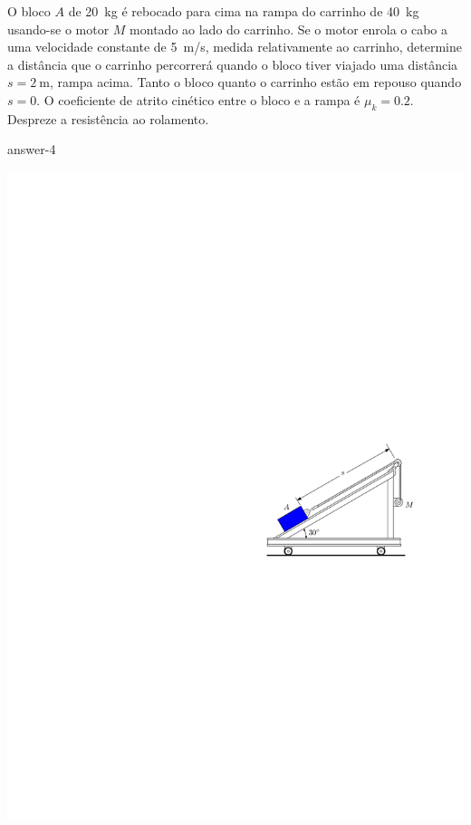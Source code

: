 \item O bloco $A$ de \SI{20}{\kilogram} é rebocado para cima na rampa do carrinho de \SI{40}{\kilogram} usando-se o motor $M$ montado ao lado do carrinho. Se o motor enrola o cabo a uma velocidade constante de \SI{5}{\meter/\second}, medida
relativamente ao carrinho, determine a distância que o carrinho percorrerá quando o bloco tiver viajado uma distância $s=\SI{2}{\meter}$, rampa acima. Tanto o bloco quanto o carrinho estão em repouso quando $s=0$. O coeficiente de atrito
cinético entre o bloco e a rampa é $\mu_{k}=0.2$. Despreze a resistência
ao rolamento.

{answer-4}

\vspace{-1.4cm}
\begin{flushright}
	\includegraphics[scale=1.2]{images/draw_4}
\end{flushright}